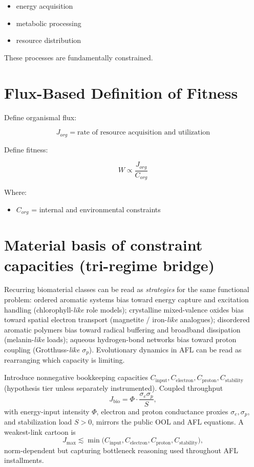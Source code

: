 \documentclass[11pt]{article}
\begin{document}
\begin{itemize}
    \item energy acquisition
    \item metabolic processing
    \item resource distribution
\end{itemize}

These processes are fundamentally constrained.

\section{Flux-Based Definition of Fitness}

Define organismal flux:

\begin{equation}
J_{org} = \text{rate of resource acquisition and utilization}
\end{equation}

Define fitness:

\begin{equation}
W \propto \frac{J_{org}}{C_{org}}
\end{equation}

Where:

\begin{itemize}
    \item $C_{org}$ = internal and environmental constraints
\end{itemize}

\section{Material basis of constraint capacities (tri-regime bridge)}
\label{sec:material-capacities}
Recurring biomaterial classes can be read as \emph{strategies} for the same functional problem: ordered aromatic systems bias toward energy capture and excitation handling (chlorophyll-\emph{like} role models); crystalline mixed-valence oxides bias toward spatial electron transport (magnetite / iron-\emph{like} analogues); disordered aromatic polymers bias toward radical buffering and broadband dissipation (melanin-\emph{like} loads); aqueous hydrogen-bond networks bias toward proton coupling (Grotthuss-\emph{like} $\sigma_p$). Evolutionary dynamics in AFL can be read as rearranging which capacity is limiting.

Introduce nonnegative bookkeeping capacities $C_{\mathrm{input}}, C_{\mathrm{electron}}, C_{\mathrm{proton}}, C_{\mathrm{stability}}$ (hypothesis tier unless separately instrumented). Coupled throughput
\begin{equation}
    J_{\mathrm{bio}} = \Phi \cdot \frac{\sigma_e \sigma_p}{S},
\end{equation}
with energy-input intensity $\Phi$, electron and proton conductance proxies $\sigma_e,\sigma_p$, and stabilization load $S>0$, mirrors the public OOL and AFL equations. A weakest-link cartoon is
\begin{equation}
    J_{\max} \lesssim \min\!\big(C_{\mathrm{input}}, C_{\mathrm{electron}}, C_{\mathrm{proton}}, C_{\mathrm{stability}}\big),
\end{equation}
norm-dependent but capturing bottleneck reasoning used throughout AFL installments.
\end{document}
